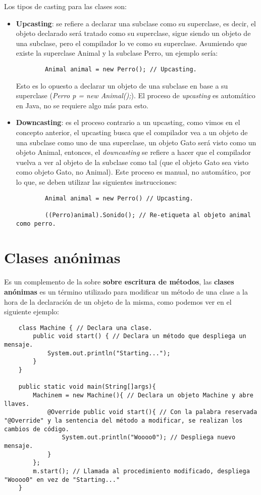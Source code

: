 Los tipos de casting para las clases son:
\begin{itemize}
    \item \textbf{Upcasting}: se refiere a declarar una subclase como su superclase, es decir, el objeto declarado será tratado como su superclase, sigue siendo un objeto de una subclase, pero el compilador lo ve como su superclase. Asumiendo que existe la superclase Animal y la subclase Perro, un ejemplo sería:
    \begin{lstlisting}
        Animal animal = new Perro(); // Upcasting.
    \end{lstlisting}
    Esto es lo opuesto a declarar un objeto de una subclase en base a su superclase (\textit{Perro p = new Animal();}). El proceso de \textit{upcasting} es automático en Java, no se requiere algo más para esto.
    \item \textbf{Downcasting}: es el proceso contrario a un upcasting, como vimos en el concepto anterior, el upcasting busca que el compilador vea a un objeto de una subclase como uno de una superclase, un objeto Gato será         visto como un objeto Animal, entonces, el \textit{downcasting} se refiere a hacer que el compilador vuelva a ver al objeto de la subclase como tal (que el objeto Gato sea visto como objeto Gato, no Animal). Este         proceso es manual, no automático, por lo que, se deben utilizar las siguientes instrucciones:
    \begin{lstlisting}
        Animal animal = new Perro() // Upcasting.

        ((Perro)animal).Sonido(); // Re-etiqueta al objeto animal como perro.
    \end{lstlisting}
\end{itemize}



\section{Clases anónimas}

Es un complemento de la sobre \textbf{sobre escritura de métodos}, las \textbf{clases anónimas} es un término utilizado para modificar un método de una clase a la hora de la declaración de un objeto de la misma, como podemos ver en el siguiente ejemplo:
\begin{lstlisting}
    class Machine { // Declara una clase.
        public void start() { // Declara un método que despliega un mensaje.
            System.out.println("Starting...");
        }
    }
    
    public static void main(String[]args){
        Machinem = new Machine(){ // Declara un objeto Machine y abre llaves.
            @Override public void start(){ // Con la palabra reservada "@Override" y la sentencia del método a modificar, se realizan los cambios de código.
                System.out.println("Woooo0"); // Despliega nuevo mensaje.
            }
        };
        m.start(); // Llamada al procedimiento modificado, despliega "Woooo0" en vez de "Starting..."
    }
\end{lstlisting}

